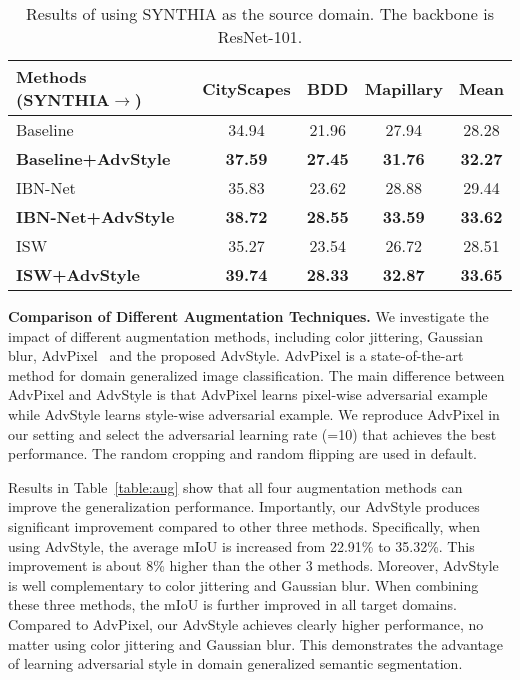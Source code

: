 \documentclass{article}
\newcommand{\ours}{AdvStyle\xspace}
\begin{document}
\begin{table}[!t]
\setlength{\tabcolsep}{3pt}
\caption{Results of using SYNTHIA as the source domain. The backbone is ResNet-101.} 
\begin{center}
\footnotesize
\begin{tabular}{l|c|c|c|c}
\toprule
Methods (SYNTHIA$\rightarrow$) & \multicolumn{1}{c|}{CityScapes} & \multicolumn{1}{c|}{BDD} & \multicolumn{1}{c|}{Mapillary} & \multicolumn{1}{c}{Mean}\\
\midrule
\midrule
{\cellcolor[gray]{1}}Baseline & 34.94		&	21.96	&		27.94&28.28 \\
\textbf{Baseline+AdvStyle}& \bf 37.59&	\bf 27.45&	\bf	31.76&	\bf 32.27\\
\cmidrule[.0001in]{1-5}
{\cellcolor[gray]{1}}IBN-Net& 35.83&			23.62		&	28.88	&		29.44\\
{\cellcolor[gray]{1}}\textbf{IBN-Net+AdvStyle} & \bf 38.72	&	\bf	28.55&	\bf 33.59&	\bf 33.62\\
\cmidrule[.0001in]{1-5}
{\cellcolor[gray]{1}}ISW& 35.27&			23.54	&	26.72	&		28.51\\
{\cellcolor[gray]{1}}\textbf{ISW+AdvStyle} &\bf 39.74&	\bf	28.33&\bf	32.87&	\bf 33.65\\
\bottomrule
\end{tabular}
\end{center}
\label{table:synthia}
\end{table}




\textbf{Comparison of Different Augmentation Techniques.} We investigate the impact of different augmentation methods, including color jittering, Gaussian blur, AdvPixel~\cite{volpi2018generalizing} and the proposed \ours. AdvPixel is a state-of-the-art method for domain generalized image classification. The main difference between AdvPixel and \ours is that AdvPixel learns pixel-wise adversarial example while \ours learns style-wise adversarial example. We reproduce AdvPixel in our setting and select the adversarial learning rate (=10) that achieves the best performance. The random cropping and random flipping are used in default. 

Results in Table~\ref{table:aug} show that all four augmentation methods can improve the generalization performance. Importantly, our \ours produces significant improvement compared to other three methods. Specifically, when using \ours, the average mIoU is increased from 22.91\% to 35.32\%. This improvement is about 8\% higher than the other 3 methods. Moreover, \ours is well complementary to color jittering and Gaussian blur. When combining these three methods, the mIoU is further improved in all target domains. Compared to AdvPixel, our \ours achieves clearly higher performance, no matter using color jittering and Gaussian blur. This demonstrates the advantage of learning adversarial style in domain generalized semantic segmentation.
\end{document}
